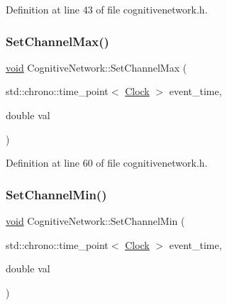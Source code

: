 Definition at line 43 of file cognitivenetwork.\+h.

\mbox{\label{class_cognitive_network_a9c208d66ee284adfceb3b2dd76532a00}} 
\subsubsection{\texorpdfstring{Set\+Channel\+Max()}{SetChannelMax()}}
{\footnotesize\ttfamily \mbox{\hyperlink{glad_8h_a950fc91edb4504f62f1c577bf4727c29}{void}} Cognitive\+Network\+::\+Set\+Channel\+Max (\begin{DoxyParamCaption}\item[{std\+::chrono\+::time\+\_\+point$<$ \mbox{\hyperlink{universe_8h_a0ef8d951d1ca5ab3cfaf7ab4c7a6fd80}{Clock}} $>$}]{event\+\_\+time,  }\item[{double}]{val }\end{DoxyParamCaption})\hspace{0.3cm}{\ttfamily [inline]}}



Definition at line 60 of file cognitivenetwork.\+h.

\mbox{\label{class_cognitive_network_a6e2a6ced4ede9a4eef721d6c5aac433c}} 
\subsubsection{\texorpdfstring{Set\+Channel\+Min()}{SetChannelMin()}}
{\footnotesize\ttfamily \mbox{\hyperlink{glad_8h_a950fc91edb4504f62f1c577bf4727c29}{void}} Cognitive\+Network\+::\+Set\+Channel\+Min (\begin{DoxyParamCaption}\item[{std\+::chrono\+::time\+\_\+point$<$ \mbox{\hyperlink{universe_8h_a0ef8d951d1ca5ab3cfaf7ab4c7a6fd80}{Clock}} $>$}]{event\+\_\+time,  }\item[{double}]{val }\end{DoxyParamCaption})\hspace{0.3cm}{\ttfamily [inline]}}



